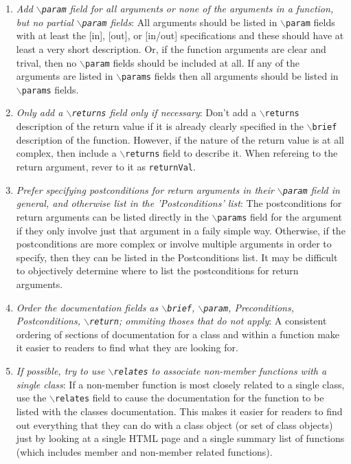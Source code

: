 \begin{enumerate}
{}\item\textit{Add {}\texttt{$\backslash$param} field for all arguments or
none of the arguments in a function, but no partial
{}\texttt{$\backslash$param} fields}: All arguments should be listed in
{}\texttt{$\backslash$param} fields with at least the [in], [out], or [in/out]
specifications and these should have at least a very short description.  Or,
if the function arguments are clear and trival, then no
{}\texttt{$\backslash$param} fields should be included at all.  If any of the
arguments are listed in {}\texttt{$\backslash$params} fields then all
arguments should be listed in {}\texttt{$\backslash$params} fields.

{}\item\textit{Only add a {}\texttt{$\backslash$returns} field only if
necessary}: Don't add a {}\texttt{$\backslash$returns} description of the
return value if it is already clearly specified in the
{}\texttt{$\backslash$brief} description of the function.  However, if the
nature of the return value is at all complex, then include a
{}\texttt{$\backslash$returns} field to describe it.  When refereing to the
return argument, rever to it as {}\texttt{returnVal}.

{}\item\textit{Prefer specifying postconditions for return arguments in their
{}\texttt{$\backslash$param} field in general, and otherwise list in the
'Postconditions' list}: The postconditions for return arguments can be listed
directly in the {}\texttt{$\backslash$params} field for the argument if they
only involve just that argument in a faily simple way.  Otherwise, if the
postconditions are more complex or involve multiple arguments in order to
specify, then they can be listed in the Postconditions list.  It may be
difficult to objectively determine where to list the postconditions for return
arguments.

{}\item\textit{Order the documentation fields as {}\texttt{$\backslash$brief},
{}\texttt{$\backslash$param}, Preconditions, Postconditions,
{}\texttt{$\backslash$return}; ommiting thoses that do not apply}: A
consistent ordering of sections of documentation for a class and within a
function make it easier to readers to find what they are looking for.

{}\item\textit{If possible, try to use {}\texttt{$\backslash$relates} to
associate non-member functions with a single class}: If a non-member function
is most closely related to a single class, use the
{}\texttt{$\backslash$relates} field to cause the documentation for the
function to be listed with the classes documentation.  This makes it easier
for readers to find out everything that they can do with a class object (or
set of class objects) just by looking at a single HTML page and a single
summary list of functions (which includes member and non-member related
functions).


\end{enumerate}
